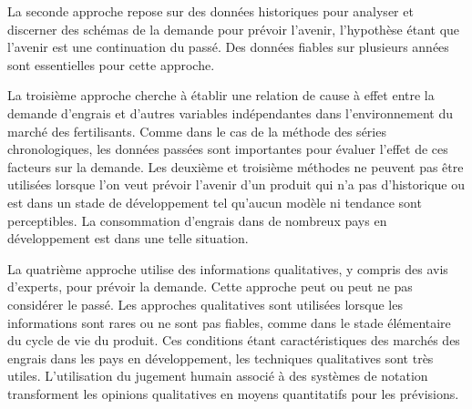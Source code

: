 	La seconde approche repose sur des données historiques pour analyser et discerner des schémas de la demande pour prévoir l'avenir, l'hypothèse étant que l'avenir est une continuation du passé. Des données fiables sur plusieurs années sont essentielles pour cette approche.\par
	La troisième approche cherche à établir une relation de cause à effet entre la demande d'engrais et d'autres variables indépendantes dans l'environnement du marché des fertilisants. Comme dans le cas de la méthode des séries chronologiques, les données passées sont importantes pour évaluer l'effet de ces facteurs sur la demande. Les deuxième et troisième méthodes ne peuvent pas être utilisées lorsque l'on veut prévoir l'avenir d'un produit qui n'a pas d'historique ou est dans un stade de développement tel qu'aucun modèle ni tendance sont perceptibles. La consommation d'engrais dans de nombreux pays en développement est dans une telle situation.\par
	La quatrième approche utilise des informations qualitatives, y compris des avis d'experts, pour prévoir la demande. Cette approche peut ou peut ne pas considérer le passé. Les approches qualitatives sont utilisées lorsque les informations sont rares ou ne sont pas fiables, comme dans le stade élémentaire du cycle de vie du produit. Ces conditions étant caractéristiques des marchés des engrais dans les pays en développement, les techniques qualitatives sont très utiles. L'utilisation du jugement humain associé à des systèmes de notation transforment les opinions qualitatives en moyens quantitatifs pour les prévisions.
